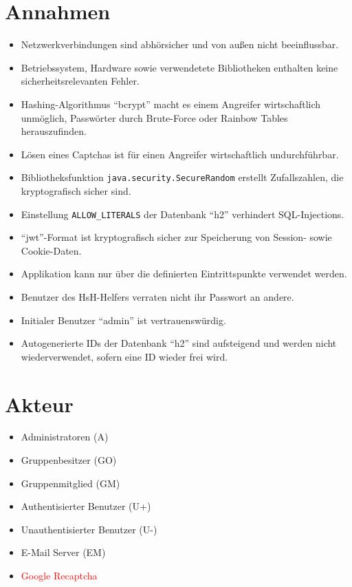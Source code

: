 \documentclass[12pt,DIV14,BCOR10mm,a4paper,parskip=half-,english,ngerman,bibliography=totocnumbered]{scrreprt}
\begin{document}
\vspace*{-3cm}

\clearpage

\tableofcontents  %

\clearpage

\chapter{Annahmen}

\begin{itemize}
  \item Netzwerkverbindungen sind abhörsicher und von außen nicht beeinflussbar.
  \item Betriebssystem, Hardware sowie verwendetete Bibliotheken enthalten keine sicherheitsrelevanten Fehler.
  \item Hashing-Algorithmus \enquote{bcrypt} macht es einem Angreifer wirtschaftlich unmöglich, Passwörter durch Brute-Force oder Rainbow Tables herauszufinden.
  \item Lösen eines Captchas ist für einen Angreifer wirtschaftlich undurchführbar.
  \item Bibliotheksfunktion \texttt{java.security.SecureRandom} \autocite{JavaDocs.SecureRandom} erstellt Zufallszahlen, die kryptografisch sicher sind.
  \item Einstellung \texttt{ALLOW\_LITERALS} der Datenbank \enquote{h2} verhindert SQL-Injections.
  \item \enquote{\gls{jwt}}-Format ist kryptografisch sicher zur Speicherung von Session- sowie Cookie-Daten.
  \item Applikation kann nur über die definierten Eintrittspunkte verwendet werden.
  \item Benutzer des HsH-Helfers verraten nicht ihr Passwort an andere.
  \item Initialer Benutzer \enquote{admin} ist vertrauenswürdig.
  \item Autogenerierte IDs der Datenbank \enquote{h2} sind aufsteigend und werden nicht wiederverwendet, sofern eine ID wieder frei wird.
\end{itemize}

\chapter{Akteur}

\begin{itemize}
  \item Administratoren (A)
  \item Gruppenbesitzer (GO)
  \item Gruppenmitglied (GM)
  \item Authentisierter Benutzer (U+)
  \item Unauthentisierter Benutzer (U-)
  \item E-Mail Server (EM)
  \item \textcolor{red}{Google Recaptcha}
\end{itemize}
\end{document}
